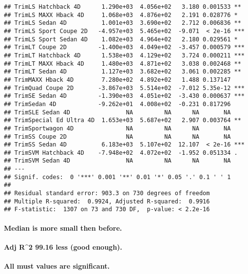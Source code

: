 \documentclass[
]{article}
\begin{document}
\begin{verbatim}
## TrimLS Hatchback 4D      1.290e+03  4.056e+02   3.180 0.001533 ** 
## TrimLS MAXX Hback 4D     1.068e+03  4.876e+02   2.191 0.028776 *  
## TrimLS Sedan 4D          1.001e+03  3.690e+02   2.712 0.006836 ** 
## TrimLS Sport Coupe 2D   -4.957e+03  5.465e+02  -9.071  < 2e-16 ***
## TrimLS Sport Sedan 4D    1.082e+03  4.964e+02   2.180 0.029561 *  
## TrimLT Coupe 2D         -1.400e+03  4.049e+02  -3.457 0.000579 ***
## TrimLT Hatchback 4D      1.538e+03  4.129e+02   3.724 0.000211 ***
## TrimLT MAXX Hback 4D     1.480e+03  4.871e+02   3.038 0.002468 ** 
## TrimLT Sedan 4D          1.127e+03  3.682e+02   3.061 0.002285 ** 
## TrimMAXX Hback 4D        7.280e+02  4.892e+02   1.488 0.137147    
## TrimQuad Coupe 2D       -3.867e+03  5.514e+02  -7.012 5.35e-12 ***
## TrimSE Sedan 4D         -1.390e+03  4.051e+02  -3.430 0.000637 ***
## TrimSedan 4D            -9.262e+01  4.008e+02  -0.231 0.817296    
## TrimSLE Sedan 4D                NA         NA      NA       NA    
## TrimSpecial Ed Ultra 4D  1.653e+03  5.687e+02   2.907 0.003764 ** 
## TrimSportwagon 4D               NA         NA      NA       NA    
## TrimSS Coupe 2D                 NA         NA      NA       NA    
## TrimSS Sedan 4D          6.183e+03  5.107e+02  12.107  < 2e-16 ***
## TrimSVM Hatchback 4D    -7.948e+02  4.072e+02  -1.952 0.051334 .  
## TrimSVM Sedan 4D                NA         NA      NA       NA    
## ---
## Signif. codes:  0 '***' 0.001 '**' 0.01 '*' 0.05 '.' 0.1 ' ' 1
## 
## Residual standard error: 903.3 on 730 degrees of freedom
## Multiple R-squared:  0.9924, Adjusted R-squared:  0.9916 
## F-statistic:  1307 on 73 and 730 DF,  p-value: < 2.2e-16
\end{verbatim}

\hypertarget{median-is-more-small-then-before.}{%
\paragraph{Median is more small then
before.}\label{median-is-more-small-then-before.}}

\hypertarget{adj-r2-99.16-less-good-enough.}{%
\paragraph{Adj R\^{}2 99.16 less (good
enough).}\label{adj-r2-99.16-less-good-enough.}}

\hypertarget{all-must-values-are-significant.}{%
\paragraph{All must values are
significant.}\label{all-must-values-are-significant.}}
\end{document}
